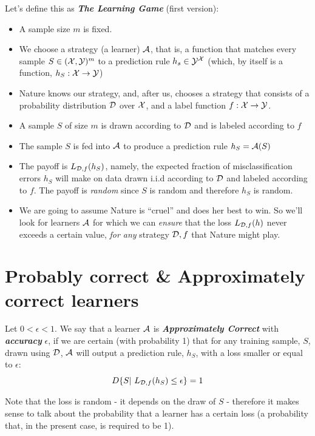 {\vspace{3mm}
\begin{definition}
Let's define this as \textit{\textbf{ The Learning Game}} (first version):
\begin{itemize}
	\item A sample size $m$ is fixed.
	\item We choose a strategy (a learner) $\mathcal{A}$, that is, a function that matches every sample $S \in (\mathcal{X},\mathcal{Y})^m$ to a prediction rule $h_s \in \mathcal{Y} ^{\mathcal{X}}$ 
	(which, by itself is a function, $h_S:\mathcal{X}\to\mathcal{Y}$) 
	\item Nature knows our strategy, and, after us, chooses a strategy that consists of a probability distribution $\mathcal{D}$ over $\mathcal{X}$, and a label function $f:\mathcal{X}\to\mathcal{Y}$. 
	\item A sample $S$ of size $m$ is drawn according to $\mathcal{D}$ and is labeled
	according to $f$
	\item The sample $S$ is fed into $\mathcal{A}$ to produce a prediction rule
	$h_S=\mathcal{A}(S)$
	\item The payoff is $L_{\mathcal{D},f}(h_S)$, namely, the expected fraction of misclassification errors $h_S$ will make on data drawn i.i.d according to $\mathcal{D}$ and labeled according to $f$.
 The payoff is \textit{random} since $S$ is random and therefore $h_S$ is random.
	\item We are going to assume Nature is ``cruel'' and does her best to win.
	So we'll look for learners $\mathcal{A}$ for which we can \textit{ensure} that the loss $L_{\mathcal{D},f}(h)$ never exceeds a certain value, \textit{for any} strategy $\mathcal{D},f$ that Nature might play.
\end{itemize}
\end{definition}



\section{Probably correct \& Approximately correct learners}

\begin{definition} \label{approximately correct}
Let $0<\epsilon<1$.  We  say that a learner $\mathcal{A}$ is \textit{\textbf{Approximately Correct}}  with  \textit{\textbf{accuracy}} $\epsilon$, if we are certain (with probability 1) that for any training sample, $S$, drawn using $\mathcal{D}$, $\mathcal{A}$ will output a prediction rule, $h_S$, with a loss smaller or equal to $\epsilon$:
$$D\{S|~ L_{\mathcal{D},f}(h_S) \leq \epsilon\}=1$$

Note that the loss is random - it depends on the draw of $S$ - therefore it makes sense to talk about the probability that a learner has a certain loss (a probability that, in the present case, is required to be 1).
\end{definition}

}
